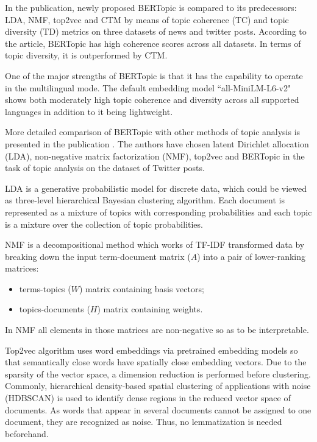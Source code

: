 \documentclass[3p,times,procedia]{elsarticle}
\begin{document}
In the publication, newly proposed BERTopic is compared to its predecessors: LDA, NMF, top2vec and CTM by means of topic coherence (TC) and topic diversity (TD) metrics on three datasets of news and twitter posts. According to the article, BERTopic has high coherence scores across all datasets. In terms of topic diversity, it is outperformed by CTM.

One of the major strengths of BERTopic is that it has the capability to operate in the multilingual mode. The default embedding model ``all-MiniLM-L6-v2" shows both moderately high topic coherence and diversity across all supported languages in addition to it being lightweight.

More detailed comparison of BERTopic with other methods of topic analysis is presented in the publication \cite{egger2022topic}. The authors have chosen latent Dirichlet allocation (LDA), non-negative matrix factorization (NMF), top2vec and BERTopic in the task of topic analysis on the dataset of Twitter posts.

LDA is a generative probabilistic model for discrete data, which could be viewed as three-level hierarchical Bayesian clustering algorithm. Each document is represented as a mixture of topics with corresponding probabilities and each topic is a mixture over the collection of topic probabilities.

NMF is a decompositional method which works of TF-IDF transformed data by breaking down the input term-document matrix ($A$) into a pair of lower-ranking matrices:
\begin{itemize}
	\item terms-topics ($W$) matrix containing basis vectors;
	\item topics-documents ($H$) matrix containing weights.
\end{itemize}
In NMF all elements in those matrices are non-negative so as to be interpretable.

Top2vec algorithm uses word embeddings via pretrained embedding models so that semantically close words have spatially close embedding vectors. Due to the sparsity of the vector space, a dimension reduction is performed before clustering. Commonly, hierarchical density-based spatial clustering of applications with noise (HDBSCAN) is used to identify dense regions in the reduced vector space of documents. As words that appear in several documents cannot be assigned to one document, they are recognized as noise. Thus, no lemmatization is needed beforehand.
\end{document}
